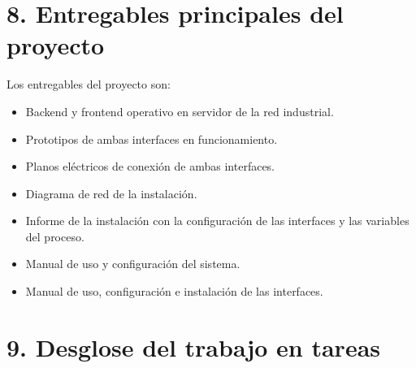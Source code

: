 \documentclass[
11pt%
]{charter}
\begin{document}


\section{8. Entregables principales del proyecto}
\label{sec:entregables}

Los entregables del proyecto son:

\begin{itemize}
	\item Backend y frontend operativo en servidor de la red industrial.
	\item Prototipos de ambas interfaces en funcionamiento.
	\item Planos eléctricos de conexión de ambas interfaces.
	\item Diagrama de red de la instalación.
	\item Informe de la instalación con la configuración de las interfaces y las variables del proceso.
	\item Manual de uso y configuración del sistema.
	\item Manual de uso, configuración e instalación de las interfaces.
		
\end{itemize}


\section{9. Desglose del trabajo en tareas}
\label{sec:wbs}
\end{document}

